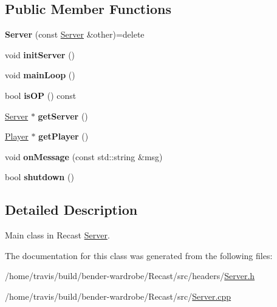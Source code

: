 \subsection*{Public Member Functions}
\begin{DoxyCompactItemize}
\item 
\hypertarget{class_server_aca4a9834f8bf136619d3c4cdb1db4e1e}{{\bfseries Server} (const \hyperlink{class_server}{Server} \&other)=delete}\label{class_server_aca4a9834f8bf136619d3c4cdb1db4e1e}

\item 
\hypertarget{class_server_a7bc5c00fa3ae1ddfae71274ee7d025ea}{void {\bfseries init\-Server} ()}\label{class_server_a7bc5c00fa3ae1ddfae71274ee7d025ea}

\item 
\hypertarget{class_server_a9bdb42db12b75864979c7849c7ee7e9f}{void {\bfseries main\-Loop} ()}\label{class_server_a9bdb42db12b75864979c7849c7ee7e9f}

\item 
\hypertarget{class_server_a7b6439f1e85af364215c544d675ea972}{bool {\bfseries is\-O\-P} () const }\label{class_server_a7b6439f1e85af364215c544d675ea972}

\item 
\hypertarget{class_server_a8af940772beedcc0b1243adf3f5aec0c}{\hyperlink{class_server}{Server} $\ast$ {\bfseries get\-Server} ()}\label{class_server_a8af940772beedcc0b1243adf3f5aec0c}

\item 
\hypertarget{class_server_a35be365123751e27d6c52ad3962b9b1e}{\hyperlink{class_player}{Player} $\ast$ {\bfseries get\-Player} ()}\label{class_server_a35be365123751e27d6c52ad3962b9b1e}

\item 
\hypertarget{class_server_a37a56fedea3137e9b8080ee0e86e8278}{void {\bfseries on\-Message} (const std\-::string \&msg)}\label{class_server_a37a56fedea3137e9b8080ee0e86e8278}

\item 
\hypertarget{class_server_a58c74bafaaf20b24e9243c7cf5fdfd16}{bool {\bfseries shutdown} ()}\label{class_server_a58c74bafaaf20b24e9243c7cf5fdfd16}

\end{DoxyCompactItemize}


\subsection{Detailed Description}
Main class in Recast \hyperlink{class_server}{Server}. 

The documentation for this class was generated from the following files\-:\begin{DoxyCompactItemize}
\item 
/home/travis/build/bender-\/wardrobe/\-Recast/src/headers/\hyperlink{_server_8h}{Server.\-h}\item 
/home/travis/build/bender-\/wardrobe/\-Recast/src/\hyperlink{_server_8cpp}{Server.\-cpp}\end{DoxyCompactItemize}

